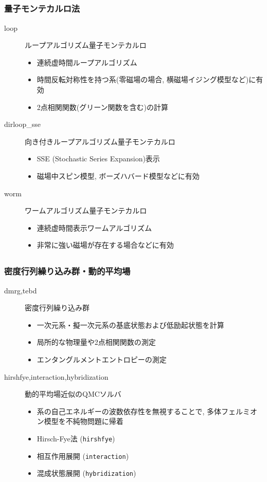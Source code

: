 \subsection*{\redb\whiteb\greenb}
\begin{frame}
  \frametitle{量子モンテカルロ法}
  \begin{description}
  \item[loop] ループアルゴリズム量子モンテカルロ
    \begin{itemize}
      \item 連続虚時間ループアルゴリズム
      \item 時間反転対称性を持つ系(零磁場の場合, 横磁場イジング模型など)に有効
      \item 2点相関関数(グリーン関数を含む)の計算
    \end{itemize}
  \item[dirloop\_sse] 向き付きループアルゴリズム量子モンテカルロ
    \begin{itemize}
      \item SSE (Stochastic Series Expansion)表示
      \item 磁場中スピン模型, ボーズハバード模型などに有効
    \end{itemize}
  \item[worm] ワームアルゴリズム量子モンテカルロ
    \begin{itemize}
      \item 連続虚時間表示ワームアルゴリズム
      \item 非常に強い磁場が存在する場合などに有効
    \end{itemize}
  \end{description}
\end{frame}

\subsection*{\redb\whiteb\greenb}
\begin{frame}
  \frametitle{密度行列繰り込み群・動的平均場}
  \begin{description}
  \item[dmrg,tebd] 密度行列繰り込み群
    \begin{itemize}
      \item 一次元系・擬一次元系の基底状態および低励起状態を計算
      \item 局所的な物理量や2点相関関数の測定
      \item エンタングルメントエントロピーの測定
    \end{itemize}
  \item[hirshfye,interaction,hybridization] 動的平均場近似のQMCソルバ
    \begin{itemize}
      \item 系の自己エネルギーの波数依存性を無視することで, 多体フェルミオン模型を不純物問題に帰着
      \item Hirsch-Fye法 ({\tt hirshfye})
      \item 相互作用展開 ({\tt interaction})
      \item 混成状態展開 ({\tt hybridization})
    \end{itemize}
  \end{description}
\end{frame}


